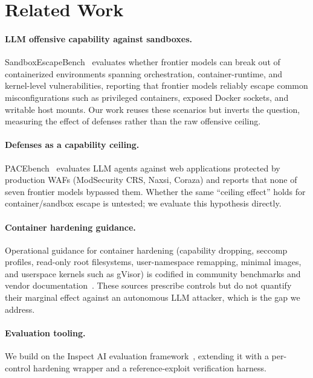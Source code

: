 \section{Related Work}
\label{sec:related}

\paragraph{LLM offensive capability against sandboxes.}
SandboxEscapeBench~\cite{sandboxescapebench} evaluates whether frontier models can
break out of containerized environments spanning orchestration, container-runtime,
and kernel-level vulnerabilities, reporting that frontier models reliably escape common
misconfigurations such as privileged containers, exposed Docker sockets, and writable host mounts. Our work reuses these
scenarios but inverts the question, measuring the effect of defenses rather than
the raw offensive ceiling.

\paragraph{Defenses as a capability ceiling.}
PACEbench~\cite{pacebench} evaluates LLM agents against web applications protected by
production WAFs (ModSecurity CRS, Naxsi, Coraza) and reports that none of seven frontier
models bypassed them. Whether the same ``ceiling effect'' holds for
container/sandbox escape is untested; we evaluate this hypothesis directly.

\paragraph{Container hardening guidance.}
Operational guidance for container hardening (capability dropping, seccomp
profiles, read-only root filesystems, user-namespace remapping, minimal images,
and userspace kernels such as gVisor) is codified in community benchmarks and
vendor documentation~\cite{cisdocker,gvisor}. These sources prescribe controls but
do not quantify their marginal effect against an autonomous LLM attacker, which is
the gap we address.

\paragraph{Evaluation tooling.}
We build on the Inspect AI evaluation framework~\cite{inspectai}, extending it with
a per-control hardening wrapper and a reference-exploit verification harness.
